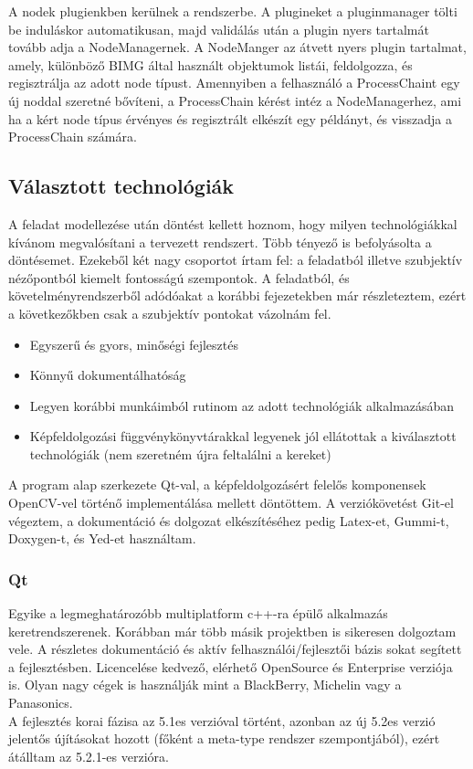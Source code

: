 \documentclass[a4paper,12pt,oneside]{report}
\begin{document}
A nodek plugienkben kerülnek a rendszerbe. A plugineket a pluginmanager tölti be induláskor automatikusan, majd validálás után a plugin nyers tartalmát tovább adja a NodeManagernek. A NodeManger az átvett nyers plugin tartalmat, amely, különböző BIMG által használt objektumok listái, feldolgozza, és regisztrálja az adott node típust. Amennyiben a felhasználó a ProcessChaint egy új noddal szeretné bővíteni, a ProcessChain kérést intéz a NodeManagerhez, ami ha a kért node típus érvényes és regisztrált elkészít egy példányt, és visszadja a ProcessChain számára.

\subsection{Választott technológiák}
A feladat modellezése után döntést kellett hoznom, hogy milyen technológiákkal kívánom megvalósítani a tervezett rendszert. Több tényező is befolyásolta a döntésemet. Ezekeből két nagy csoportot írtam fel: a feladatból illetve szubjektív nézőpontból kiemelt fontosságú szempontok. A feladatból, és követelményrendszerből adódóakat a korábbi fejezetekben már részleteztem, ezért a következőkben csak a szubjektív pontokat vázolnám fel.
\begin{itemize}
	\itemsep0em
	\item Egyszerű és gyors, minőségi fejlesztés
	\item Könnyű dokumentálhatóság
	\item Legyen korábbi munkáimból rutinom az adott technológiák alkalmazásában
	\item Képfeldolgozási függvénykönyvtárakkal legyenek jól ellátottak a kiválasztott technológiák (nem szeretném újra feltalálni a kereket)
\end{itemize}
A program alap szerkezete Qt-val, a képfeldolgozásért felelős komponensek OpenCV-vel történő implementálása mellett döntöttem. A verziókövetést Git-el végeztem, a dokumentáció és dolgozat elkészítéséhez pedig Latex-et, Gummi-t, Doxygen-t, és Yed-et használtam.
\subsubsection{Qt}
Egyike a legmeghatározóbb\cite{website:qt_1_million} multiplatform c++-ra épülő alkalmazás keretrendszerenek. \cite{website:qt_about} Korábban már több másik projektben is sikeresen dolgoztam vele. A részletes dokumentáció és aktív felhasználói/fejlesztői bázis sokat segített a fejlesztésben. \cite{website:qt_dochome} \cite{website:qt_docforum}\cite{website:qt_docmaillist} Licencelése kedvező, elérhető OpenSource és Enterprise verziója is. Olyan nagy cégek is használják mint a BlackBerry, Michelin vagy a Panasonics.\cite{website:qt_in_use} \\ A fejlesztés korai fázisa az 5.1es verzióval történt, azonban az új 5.2es verzió jelentős újításokat hozott (főként a meta-type rendszer szempontjából), ezért átálltam az 5.2.1-es verzióra.
\end{document}
